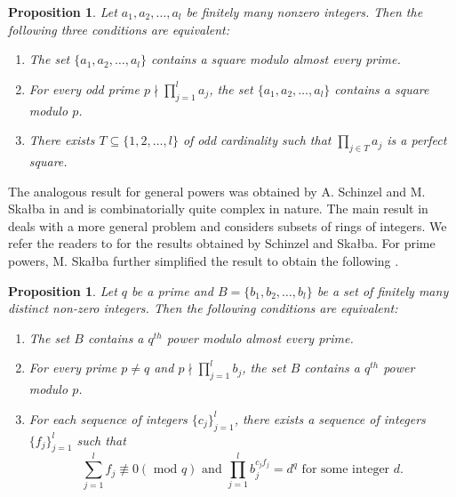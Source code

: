 \documentclass[12pt]{amsart}
\newtheorem{proposition}[theorem]{Proposition}
\begin{document}
\begin{proposition}
Let $a_{1}, a_{2}, \ldots , a_{l}$ be finitely many nonzero integers. Then the following three conditions are equivalent:
\begin{enumerate}
    
    \item The set $\{a_{1}, a_{2}, \ldots, a_{l}\}$ contains a square modulo almost every prime.\vspace{1mm} 
    
    \item For every odd prime $p \nmid \prod_{j=1}^{l} a_{j}$, the set $\{a_{1}, a_{2}, \ldots, a_{l}\}$ contains a square modulo $p$.\vspace{1mm}
    
    \item There exists $T \subseteq \{1, 2, \ldots , l\}$ of odd cardinality such that $\prod_{j\in T} a_{j} $ is a perfect square.
    
\end{enumerate}
\label{FR}
\end{proposition}

The analogous result for general powers was obtained by A. Schinzel and M. Skałba in \cite{SS} and is combinatorially quite complex in nature. The main result in \cite{SS} deals with a more general problem and considers subsets of rings of integers. We refer the readers to \cite[Theorems 1, 2]{SS} for the results obtained by Schinzel and Skałba. For prime powers, M. Skałba further simplified the result to obtain the following \cite{skalba2005sets}.


\begin{proposition}
Let $q$ be a prime and $B = \{ b_{1}, b_{2}, \ldots, b_{l}\}$ be a set of finitely many distinct non-zero integers. Then the following conditions are equivalent:
\begin{enumerate}

    \item The set $B$ contains a $q^{th}$ power modulo almost every prime. \vspace{1mm}
    
    \item For every prime $p \neq q$ and $p \nmid \prod_{j=1}^{l} b_{j}$, the set $B$ contains a $q^{th}$ power modulo $p$. \vspace{1mm}

    \item For each sequence of integers $\{c_{j}\}_{j=1}^{l}$, there exists a sequence of integers $\{f_{j}\}_{j=1}^{l}$ such that \begin{equation}
\sum_{j=1}^{l} f_{j} \not\equiv 0 (\text{ mod } q) \text{ and } \prod_{j=1}^{l} b_{j}^{c_{j}f_{j}} = d^{q} \text{ for some integer } d. \label{skalbalemmaequation}
\end{equation}
\end{enumerate}
\label{Skalbalemma}
\end{proposition}
 
\end{document}
